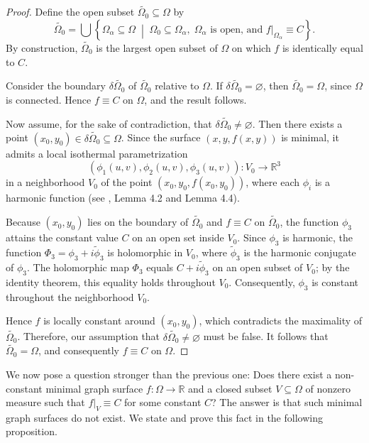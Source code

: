 \documentclass[12pt]{article}
\theoremstyle{plain}
\theoremstyle{definition}
\theoremstyle{remark}
\begin{document}
   \begin{proof}
	  Define the open subset \( \tilde{\Omega_0} \subseteq \Omega \) by
	  \[
	    \tilde{\Omega_0} = \bigcup \left\{ \Omega_{\alpha} \subseteq \Omega \;\middle|\; \Omega_0 \subseteq \Omega_{\alpha},\; \Omega_{\alpha} \text{ is open, and } f|_{\Omega_{\alpha}} \equiv C \right\}.
	  \]
	  By construction, \( \tilde{\Omega_0} \) is the largest open subset of \( \Omega \) on which \( f \) is identically equal to \( C \).
	
	  Consider the boundary \( \delta \tilde{\Omega_0} \) of \( \tilde{\Omega_0} \) relative to \( \Omega \). If \( \delta \tilde{\Omega_0} = \varnothing \), then \( \tilde{\Omega_0} = \Omega \), since \( \Omega \) is connected. Hence \( f \equiv C \) on \( \Omega \), and the result follows.
	
      Now assume, for the sake of contradiction, that \( \delta \tilde{\Omega_0} \neq \varnothing \). Then there exists a point \( (x_0, y_0) \in \delta \tilde{\Omega_0} \subseteq \Omega \). Since the surface \( (x, y, f(x, y)) \) is minimal, it admits a local isothermal parametrization
	  \[
	    (\phi_1(u,v), \phi_2(u,v), \phi_3(u,v)) : V_0 \longrightarrow \mathbb{R}^3
	  \]
	  in a neighborhood \( V_0 \) of the point  \( (x_0, y_0, f(x_0, y_0)) \), where each \( \phi_i \) is a harmonic function (see \cite{Os}, Lemma 4.2 and Lemma 4.4).
	
	   
	  Because $(x_0, y_0)$ lies on the boundary of $\tilde{\Omega_0}$ and $f \equiv C$ on $\tilde{\Omega_0}$, the function $\phi_3$ attains the constant value $C$ on an open set inside $V_0$. Since $\phi_3$ is harmonic, the function $\Phi_3 = \phi_3 + i\tilde{\phi}_3$ is holomorphic in $V_0$, where $\tilde{\phi}_3$ is the harmonic conjugate of $\phi_3$. The holomorphic map $\Phi_3$ equals $C + i\tilde{\phi}_3$ on an open subset of $V_0$; by the identity theorem, this equality holds throughout $V_0$. Consequently, $\phi_3$ is constant throughout the neighborhood $V_0$.
	
	  Hence \( f \) is locally constant around \( (x_0, y_0) \), which contradicts the maximality of \( \tilde{\Omega_0} \). Therefore, our assumption that \( \delta \tilde{\Omega_0} \neq \varnothing \) must be false. It follows that \( \tilde{\Omega_0} = \Omega \), and consequently \( f \equiv C \) on \( \Omega \).
  \end{proof}

   We now pose a question stronger than the previous one: Does there exist a non-constant minimal graph surface \(f: \Omega \longrightarrow \mathbb{R}\) and a closed subset \(V \subseteq \Omega\) of nonzero measure such that \(f\big|_V \equiv C\) for some constant \(C\)? The answer is that such minimal graph surfaces do not exist. We state and prove this fact in the following proposition.
  
\end{document}
